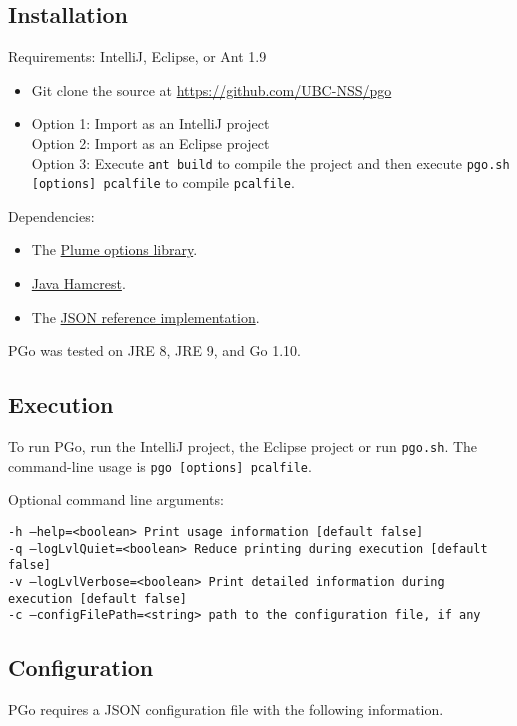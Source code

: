 \subsection{Installation}
Requirements: IntelliJ, Eclipse, or Ant 1.9

\begin{itemize}
\item Git clone the source at \url{https://github.com/UBC-NSS/pgo}

\item Option 1: Import as an IntelliJ project \\
Option 2: Import as an Eclipse project \\
Option 3: Execute \texttt{ant build} to compile the project and then execute \texttt{pgo.sh [options] pcalfile} to compile \texttt{pcalfile}.
\end{itemize}

Dependencies:
\begin{itemize}
\item The \href{https://mernst.github.io/plume-lib/}
	{Plume options library}.

\item \href{http://hamcrest.org/JavaHamcrest/}
	{Java Hamcrest}.

\item The \href{https://github.com/stleary/JSON-java}
	{JSON reference implementation}.
\end{itemize}


PGo was tested on JRE 8, JRE 9, and Go 1.10.

\subsection{Execution}
To run PGo, run the IntelliJ project, the Eclipse project or run \texttt{pgo.sh}. The command-line usage is \texttt{pgo [options] pcalfile}.

Optional command line arguments:

\noindent
\texttt{-h --help=<boolean> Print usage information [default false]\\
	-q --logLvlQuiet=<boolean> Reduce printing during execution [default false]\\
	-v --logLvlVerbose=<boolean> Print detailed information during execution  [default false]\\
	-c --configFilePath=<string> path to the configuration file, if any}

\subsection{Configuration}
PGo requires a JSON configuration file with the following information.

